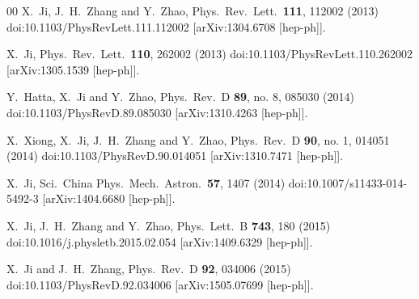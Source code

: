 \begin{thebibliography}{00}
	X.~Ji, J.~H.~Zhang and Y.~Zhao,
	Phys.\ Rev.\ Lett.\  {\bf 111}, 112002 (2013)
	doi:10.1103/PhysRevLett.111.112002
	[arXiv:1304.6708 [hep-ph]].



	X.~Ji,
	Phys.\ Rev.\ Lett.\  {\bf 110}, 262002 (2013)
	doi:10.1103/PhysRevLett.110.262002
	[arXiv:1305.1539 [hep-ph]].


	Y.~Hatta, X.~Ji and Y.~Zhao,
	Phys.\ Rev.\ D {\bf 89}, no. 8, 085030 (2014)
	doi:10.1103/PhysRevD.89.085030
	[arXiv:1310.4263 [hep-ph]].


	X.~Xiong, X.~Ji, J.~H.~Zhang and Y.~Zhao,
	Phys.\ Rev.\ D {\bf 90}, no. 1, 014051 (2014)
	doi:10.1103/PhysRevD.90.014051
	[arXiv:1310.7471 [hep-ph]].


	X.~Ji,
	Sci.\ China Phys.\ Mech.\ Astron.\  {\bf 57}, 1407 (2014)
	doi:10.1007/s11433-014-5492-3
	[arXiv:1404.6680 [hep-ph]].


	X.~Ji, J.~H.~Zhang and Y.~Zhao,
	Phys.\ Lett.\ B {\bf 743}, 180 (2015)
	doi:10.1016/j.physletb.2015.02.054
	[arXiv:1409.6329 [hep-ph]].


	X.~Ji and J.~H.~Zhang,
	Phys.\ Rev.\ D {\bf 92}, 034006 (2015)
	doi:10.1103/PhysRevD.92.034006
	[arXiv:1505.07699 [hep-ph]].



\end{thebibliography}
